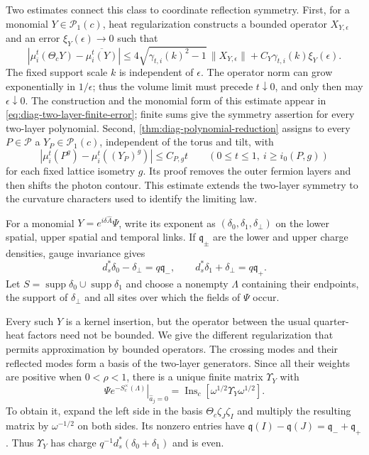 \documentclass[11pt,letterpaper,reqno]{amsart}
\DeclareMathOperator{\supp}{supp}
\begin{document}
Two estimates connect this class to coordinate reflection symmetry.
First, for a monomial $Y\in\mathcal P_1(c)$, heat regularization constructs a
bounded operator $X_{Y,\epsilon}$ and an error
$\xi_Y(\epsilon)\to0$ such that
\[
 |\mu_i^t(\Theta_cY)-\overline{\mu_i^t(Y)}|
 \le4\sqrt{\gamma_{t,i}(k)^2-1}\,\|X_{Y,\epsilon}\|
       +C_Y\gamma_{t,i}(k)\xi_Y(\epsilon).
\]
The fixed support scale $k$ is independent of $\epsilon$.
The operator norm can grow exponentially in $1/\epsilon$; thus the
volume limit must precede $t\downarrow0$, and only then may
$\epsilon\downarrow0$. The construction and the monomial form of
this estimate appear in \eqref{eq:diag-two-layer-finite-error};
finite sums give the symmetry assertion for every two-layer polynomial.
Second, \cref{thm:diag-polynomial-reduction} assigns to every
$P\in\mathcal P$ a $Y_P\in\mathcal P_1(c)$, independent of the
torus and tilt, with
\[
 |\mu_i^t(P^g)-\mu_i^t((Y_P)^g)|\le C_{P,g}t
 \qquad(0\le t\le1,\ i\ge i_0(P,g))
\]
for each fixed lattice isometry $g$. Its proof removes the outer
fermion layers and then shifts the photon contour. This estimate
extends the two-layer symmetry to the curvature characters used
to identify the limiting law.

For a monomial
$Y=e^{i\delta\widehat A}\Psi$, write its exponent as
$(\delta_0,\delta_1,\delta_\perp)$ on the lower spatial, upper
spatial and temporal links. If $\mathfrak q_\pm$ are the lower
and upper charge densities, gauge invariance gives
\begin{equation}\label{eq:diag-two-layer-gauss}
 d_s^*\delta_0-\delta_\perp=q\mathfrak q_-,\qquad
 d_s^*\delta_1+\delta_\perp=q\mathfrak q_+.
\end{equation}
Let $S=\supp\delta_0\cup\supp\delta_1$ and choose a nonempty $\Lambda$
containing their endpoints, the support of $\delta_\perp$ and
all sites over which the fields of $\Psi$ occur.

Every such $Y$ is a kernel insertion, but the operator between
the usual quarter-heat factors need not be bounded. We give the
different regularization that permits approximation by bounded
operators. The crossing modes and their reflected modes form a
basis of the two-layer generators. Since all their weights are
positive when $0<\rho<1$, there is a unique finite matrix
$\Upsilon_Y$ with
\begin{equation}\label{eq:diag-two-layer-matrix}
 \left.\Psi e^{-S_c^\times(\Lambda)}\right|_{\widehat a_j=0}
       =\operatorname{Ins}_c[
                      \omega^{1/2}\Upsilon_Y\omega^{1/2}].
\end{equation}
To obtain it, expand the left side in the basis
$\Theta_c\zeta_J\zeta_I$ and multiply the resulting matrix by
$\omega^{-1/2}$ on both sides. Its nonzero entries have
$\mathfrak q(I)-\mathfrak q(J)=\mathfrak q_-+\mathfrak q_+$.
Thus $\Upsilon_Y$ has charge
$q^{-1}d_s^*(\delta_0+\delta_1)$ and is even.
\end{document}
